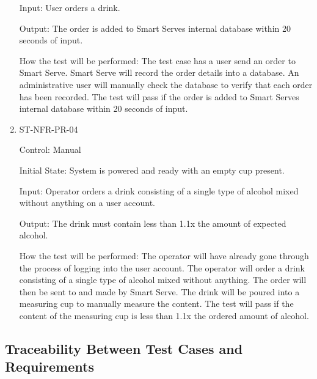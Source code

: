\documentclass[12pt, titlepage]{article}
\begin{document}
\begin{enumerate}
Input: User orders a drink.

Output: The order is added to Smart Serves internal database within 20 seconds of input.

How the test will be performed: The test case has a user send an order to Smart Serve. Smart Serve will record the order details into a database. An administrative user will manually check the database to verify that each order has been recorded. The  test will pass if the order is added to Smart Serves internal database within 20 seconds of input.

\item{ST-NFR-PR-04\\}

Control: Manual

Initial State: System is powered and ready with an empty cup present.

Input: Operator orders a drink consisting of a single type of alcohol mixed without anything on a user account.

Output: The drink must contain less than 1.1x the amount of expected alcohol.

How the test will be performed: The operator will have already gone through the process of logging into the user account. The operator will order a drink consisting of a single type of alcohol mixed without anything. The order will then be sent to and made by Smart Serve. The drink will be poured into a measuring cup to manually measure the content. The test will pass if the content of the measuring cup is less than 1.1x the ordered amount of alcohol.


\end{enumerate}

\subsection{Traceability Between Test Cases and Requirements}

\end{document}
